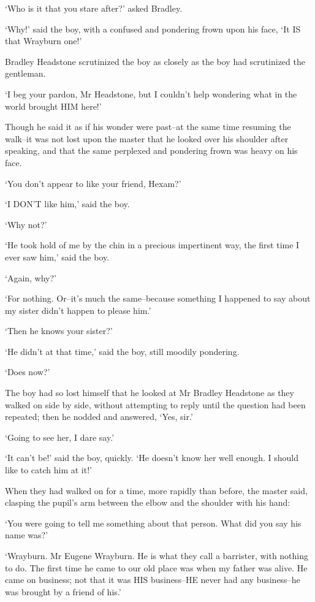 ‘Who is it that you stare after?’ asked Bradley.

‘Why!’ said the boy, with a confused and pondering frown upon his face,
‘It IS that Wrayburn one!’

Bradley Headstone scrutinized the boy as closely as the boy had
scrutinized the gentleman.

‘I beg your pardon, Mr Headstone, but I couldn’t help wondering what in
the world brought HIM here!’

Though he said it as if his wonder were past--at the same time resuming
the walk--it was not lost upon the master that he looked over his
shoulder after speaking, and that the same perplexed and pondering frown
was heavy on his face.

‘You don’t appear to like your friend, Hexam?’

‘I DON’T like him,’ said the boy.

‘Why not?’

‘He took hold of me by the chin in a precious impertinent way, the first
time I ever saw him,’ said the boy.

‘Again, why?’

‘For nothing. Or--it’s much the same--because something I happened to
say about my sister didn’t happen to please him.’

‘Then he knows your sister?’

‘He didn’t at that time,’ said the boy, still moodily pondering.

‘Does now?’

The boy had so lost himself that he looked at Mr Bradley Headstone
as they walked on side by side, without attempting to reply until the
question had been repeated; then he nodded and answered, ‘Yes, sir.’

‘Going to see her, I dare say.’

‘It can’t be!’ said the boy, quickly. ‘He doesn’t know her well enough.
I should like to catch him at it!’

When they had walked on for a time, more rapidly than before, the master
said, clasping the pupil’s arm between the elbow and the shoulder with
his hand:

‘You were going to tell me something about that person. What did you say
his name was?’

‘Wrayburn. Mr Eugene Wrayburn. He is what they call a barrister, with
nothing to do. The first time he came to our old place was when my
father was alive. He came on business; not that it was HIS business--HE
never had any business--he was brought by a friend of his.’

